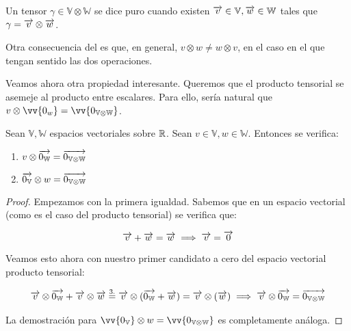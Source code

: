 \begin{definicion}
    Un tensor $\gamma \in \mathbb{V} \otimes \mathbb{W}$ se dice puro cuando existen $\overrightarrow{v} \in \mathbb{V}, \overrightarrow{w} \in \mathbb{W}$ tales que $\gamma = \overrightarrow{v} \otimes \overrightarrow{w}$.
\end{definicion}

Otra consecuencia del  es que, en general, $v \otimes w \neq w \otimes v$, en el caso en el que tengan sentido las dos operaciones.

Veamos ahora otra propiedad interesante. Queremos que el producto tensorial se asemeje al producto entre escalares. Para ello, sería natural que $v \otimes \vv{0_w} = \vv{0_{\mathbb{V} \otimes \mathbb{W}}}$.

\begin{proposicion}
    Sean $\mathbb{V}, \mathbb{W}$ espacios vectoriales sobre $\mathbb{R}$. Sean $v \in \mathbb{V}, w \in \mathbb{W}$. Entonces se verifica:

    \begin{enumerate}
        \item $v \otimes \overrightarrow{0_\mathbb{W}} = \overrightarrow{0_{\mathbb{V} \otimes \mathbb{W}}}$
        \item $\overrightarrow{0_{\mathbb{V}}} \otimes w = \overrightarrow{0_{\mathbb{V} \otimes \mathbb{W}}}$
    \end{enumerate}
\end{proposicion}
\begin{proof}
    Empezamos con la primera igualdad. Sabemos que en un espacio vectorial (como es el caso del producto tensorial) se verifica que:

    \begin{equation} \label{eq:dem_tensor_cero}
        \overrightarrow{v} + \overrightarrow{w} = \overrightarrow{w} \implies \overrightarrow{v} = \overrightarrow{0}
    \end{equation}

    Veamos esto ahora con nuestro primer candidato a cero del espacio vectorial producto tensorial:

    \begin{equation}
    \begin{split}
        \overrightarrow{v} \otimes \overrightarrow{0_\mathbb{W}} + \overrightarrow{v} \otimes \overrightarrow{w} \stackrel{\text{3.}}{=} \overrightarrow{v} \otimes (\overrightarrow{0_\mathbb{W}} + \overrightarrow{w}) = \overrightarrow{v} \otimes (\overrightarrow{w}) \implies \overrightarrow{v} \otimes \overrightarrow{0_\mathbb{W}} = \overrightarrow{0_{\mathbb{V} \otimes \mathbb{W}}}
    \end{split}
    \end{equation}

    La demostración para $\vv{0_{\mathbb{V}}} \otimes w = \vv{0_{\mathbb{V} \otimes \mathbb{W}}}$ es completamente análoga.


\end{proof}

